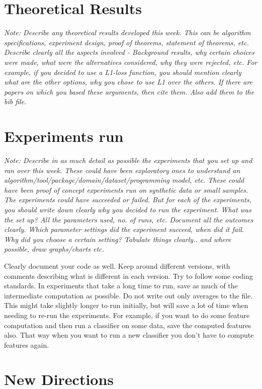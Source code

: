 \documentclass{article}[11pt]
\begin{document}
\section{Theoretical Results}
{\it Note: Describe any theoretical results developed this week. This can
be algorithm specifications, experiment design, proof of theorems, statement
of theorems, etc. Describe clearly all the aspects involved - Background
results, why certain choices were made, what were the alternatives
considered, why they were rejected, etc. For example, if you decided to use
a L1-loss function, you should mention clearly what are the other options,
why you chose to use L1 over the others. If there are papers on which you
based these arguments, then cite them. Also add them to the bib file. }

\section{Experiments run}
{\it Note: Describe in as much detail as possible the experiments that you
set up and ran over this week. These could have been exploratory ones to
understand an algorithm/tool/package/domain/dataset/programming model, etc.
These could have been proof of concept experiments run on synthetic data or
small samples. The experiments could have succeeded or failed. But for each
of the experiments, you should write down clearly why you decided to run the
experiment. What was the set up? All the parameters used, no. of runs, etc.
Document all the outcomes clearly. Which parameter settings did the
experiment succeed, when did it fail. Why did you choose a certain setting?
Tabulate things clearly.. and where possible, draw graphs/charts etc.

Clearly document your code as well. Keep around different versions, with
comments describing what is different in each version. Try to follow some
coding standards. In experiments that take a long time to run, save as much
of the intermediate computation as possible. Do not write out only averages
to the file. This might take slightly longer to run initially, but will save
a lot of time when needing to re-run the experiments. For example, if you
want to do some feature computation and then run a classifier on some data,
save the computed features also. That way when you want to run a new
classifier you don't have to compute features again.}

\section{New Directions}
\end{document}

